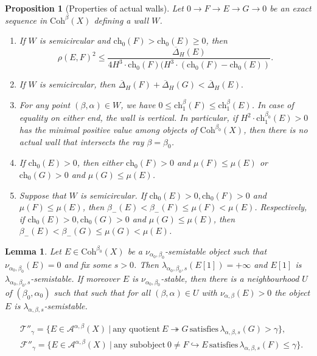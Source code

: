 \documentclass[10pt,a4paper]{amsart}
\newtheorem{proposition}{Proposition}
\newtheorem{lemma}{Lemma}
\def\FF{\ensuremath{\mathcal F}}
\def\TT{\ensuremath{\mathcal T}}
\newcommand{\into}{\hookrightarrow}
\newcommand{\onto}{\twoheadrightarrow}
\begin{document}
	\begin{proposition}[Properties of actual walls]\label{actual}Let $0\to F\to E\to G\to 0$ be an exact sequence in $\mathrm{Coh}^\beta(X)$ defining a wall $W$.
		\begin{enumerate}
			\item If $W$ is semicircular and $\mathrm{ch}_0(F)>\mathrm{ch}_0(E)\ge 0$, then
			$$\rho(E,F)^2\le\frac{\overline{\Delta}_H(E)}{4H^3\cdot\mathrm{ch}_0(F)(H^3\cdot(\mathrm{ch}_0(F)-\mathrm{ch}_0(E))}.$$
			\item If $W$ is semicircular, then $\overline{\Delta}_H(F)+\overline{\Delta}_H(G)<\overline{\Delta}_H(E).$
			\item For any point $(\beta,\alpha)\in W$, we have $0\le\mathrm{ch}_1^\beta(F)\le\mathrm{ch}_1^\beta(E)$. In case of equality on either end, the wall is vertical. In particular, if $H^2\cdot\mathrm{ch}_1^{\beta_0}(E)>0$ has the minimal positive value among objects of $\mathrm{Coh}^{\beta_0}(X)$, then there is no actual wall that intersects the ray $\beta=\beta_0$.
			\item If $\mathrm{ch}_0(E)>0$, then either $\mathrm{ch}_0(F)>0$ and $\mu(F)\le\mu(E)$ or $\mathrm{ch}_0(G)>0$ and $\mu(G)\le\mu(E)$. 
			\item Suppose that $W$ is semicircular. If $\mathrm{ch}_0(E)>0, \mathrm{ch}_0(F)>0$ and $\mu(F)\le\mu(E)$, then $\beta_-(E)<\beta_-(F)\le\mu(F)<\mu(E)$. Respectively, if $\mathrm{ch}_0(E)>0, \mathrm{ch}_0(G)>0$ and $\mu(G)\le\mu(E)$, then $\beta_-(E)<\beta_-(G)\le\mu(G)<\mu(E)$. 
		\end{enumerate}
	\end{proposition}

	\begin{lemma}\label{nu-lambda}
		Let $E\in\mathrm{Coh}^{\beta_0}(X)$ be a $\nu_{\alpha_0,\beta_0}$-semistable object such that $\nu_{\alpha_0,\beta_0}(E)=0$ and fix some $s>0$. Then $\lambda_{{\alpha_0},{\beta_0},s}(E[1])=+\infty$ and $E[1]$ is $\lambda_{{\alpha_0},{\beta_0},s}
		$-semistable. If moreover $E$ is $\nu_{\alpha_0,\beta_0}$-stable, then there is a neighbourhood $U$ of $(\beta_0,\alpha_0)$ such that such that for all $(\beta,\alpha)\in U$ with $\nu_{\alpha,\beta}(E)
		>0$ the object $E$ is $\lambda_{\alpha,\beta,s}$-semistable.
	\end{lemma}

		\begin{equation}\label{T'' F''}
				\begin{split}
						& \TT''_{\gamma}=\{E\in\mathcal A^{\alpha,\beta}(X)\ |\ \text{any quotient}\ E\onto G
						\,\text{satisfies}\,\lambda_{\alpha,\beta, s}(G)>\gamma \}, \\
						& \FF''_{\gamma} = \{E \in \mathcal A^{\alpha, \beta}(X)\ |\ \text{any
								subobject}\ 0\ne F\into E\,\text{satisfies}\, \lambda_{\alpha,\beta, s}(F)\leq\gamma\}.
					\end{split}
			\end{equation}
\end{document}
